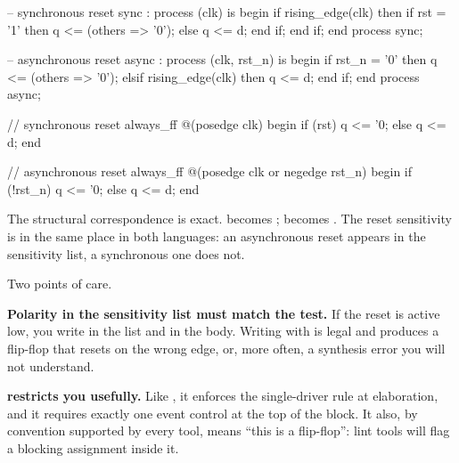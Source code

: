 \begin{rosetta}
\begin{rleft}
-- synchronous reset
sync : process (clk) is
begin
  if rising_edge(clk) then
    if rst = '1' then
      q <= (others => '0');
    else
      q <= d;
    end if;
  end if;
end process sync;

-- asynchronous reset
async : process (clk, rst_n) is
begin
  if rst_n = '0' then
    q <= (others => '0');
  elsif rising_edge(clk) then
    q <= d;
  end if;
end process async;
\end{rleft}
\begin{rright}
// synchronous reset
always_ff @(posedge clk) begin
  if (rst) q <= '0;
  else     q <= d;
end



// asynchronous reset
always_ff @(posedge clk or
            negedge rst_n) begin
  if (!rst_n) q <= '0;
  else        q <= d;
end
\end{rright}
\end{rosetta}


The structural correspondence is exact.  becomes
;  becomes . The reset
sensitivity is in the same place in both languages: an asynchronous reset
appears in the sensitivity list, a synchronous one does not.

Two points of care.

\textbf{Polarity in the sensitivity list must match the test.} If the reset is
active low, you write  in the list and 
in the body. Writing  with  is legal and
produces a flip-flop that resets on the wrong edge, or, more often, a synthesis
error you will not understand.

\textbf{ restricts you usefully.} Like , it
enforces the single-driver rule at elaboration, and it requires exactly one
event control at the top of the block. It also, by convention supported by
every tool, means ``this is a flip-flop'': lint tools will flag a blocking
assignment inside it.

